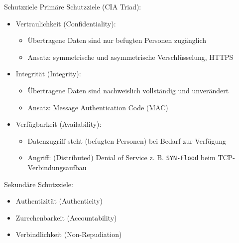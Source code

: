 \begin{defi}{Schutzziele}
    Primäre Schutzziele (CIA Triad):
    \begin{itemize}
        \item Vertraulichkeit (Confidentiality):
              \begin{itemize}
                  \item Übertragene Daten sind nur befugten Personen zugänglich
                  \item Ansatz: symmetrische und asymmetrische Verschlüsselung, HTTPS
              \end{itemize}
        \item Integrität (Integrity):
              \begin{itemize}
                  \item Übertragene Daten sind nachweislich vollständig und unverändert
                  \item Ansatz: Message Authentication Code (MAC)
              \end{itemize}
        \item Verfügbarkeit (Availability):
              \begin{itemize}
                  \item Datenzugriff steht (befugten Personen) bei Bedarf zur Verfügung
                  \item Angriff: (Distributed) Denial of Service z. B. \texttt{SYN-Flood} beim TCP-Verbindungsaufbau
              \end{itemize}
    \end{itemize}

    Sekundäre Schutzziele:
    \begin{itemize}
        \item Authentizität (Authenticity)
        \item Zurechenbarkeit (Accountability)
        \item Verbindlichkeit (Non-Repudiation)
    \end{itemize}
\end{defi}

